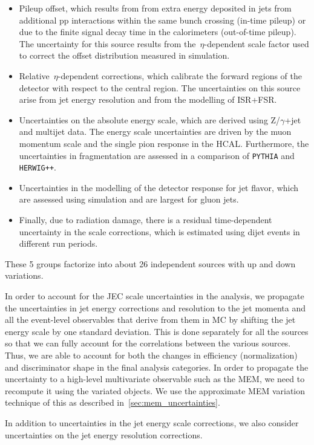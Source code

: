 \begin{itemize}
\item Pileup offset, which results from from extra energy deposited in jets from additional pp interactions within the same bunch crossing (in-time pileup) or due to the finite signal decay time in the calorimeters (out-of-time pileup). The uncertainty for this source results from the~$\eta$-dependent scale factor used to correct the offset distribution measured in simulation.
\item Relative~$\eta$-dependent corrections, which calibrate the forward regions of the detector with respect to the central region. The uncertainties on this source arise from jet energy resolution and from the modelling of ISR+FSR.
\item Uncertainties on the absolute energy scale, which are derived using Z/$\gamma$+jet and multijet data. The energy scale uncertainties are driven by the muon momentum scale and the single pion response in the HCAL. Furthermore, the uncertainties in fragmentation are assessed in a comparison of \texttt{PYTHIA} and \texttt{HERWIG++}.
\item Uncertainties in the modelling of the detector response for jet flavor, which are assessed using simulation and are largest for gluon jets.
\item Finally, due to radiation damage, there is a residual time-dependent uncertainty in the scale corrections, which is estimated using dijet events in different run periods.
\end{itemize}
These 5 groups factorize into about 26 independent sources with up and down variations.

In order to account for the JEC scale uncertainties in the analysis, we propagate the uncertainties in jet energy corrections and resolution to the jet momenta and all the event-level observables that derive from them in MC by shifting the jet energy scale by one standard deviation. This is done separately for all the sources so that we can fully account for the correlations between the various sources. Thus, we are able to account for both the changes in efficiency (normalization) and discriminator shape in the final analysis categories.
In order to propagate the uncertainty to a high-level multivariate observable such as the MEM, we need to recompute it using the variated objects. We use the approximate MEM variation technique of this as described in~\cref{sec:mem_uncertainties}.

In addition to uncertainties in the jet energy scale corrections, we also consider uncertainties on the jet energy resolution corrections. 
